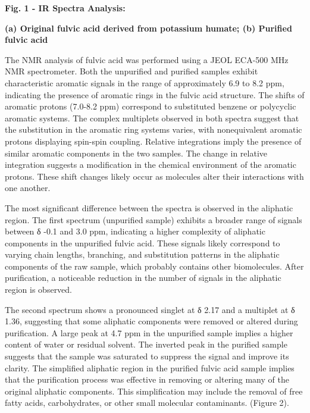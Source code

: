 {\bfseries Fig. 1 - IR Spectra Analysis:}

{\bfseries (a) Original fulvic acid derived from potassium humate; (b)
Purified fulvic acid}

\begin{multicols}{2}
The NMR analysis of fulvic acid was performed using a JEOL ECA-500 MHz
NMR spectrometer. Both the unpurified and purified samples exhibit
characteristic aromatic signals in the range of approximately 6.9 to 8.2
ppm, indicating the presence of aromatic rings in the fulvic acid
structure. The shifts of aromatic protons (7.0-8.2 ppm) correspond to
substituted benzene or polycyclic aromatic systems. The complex
multiplets observed in both spectra suggest that the substitution in the
aromatic ring systems varies, with nonequivalent aromatic protons
displaying spin-spin coupling. Relative integrations imply the presence
of similar aromatic components in the two samples. The change in
relative integration suggests a modification in the chemical environment
of the aromatic protons. These shift changes likely occur as molecules
alter their interactions with one another.

The most significant difference between the spectra is observed in the
aliphatic region. The first spectrum (unpurified sample) exhibits a
broader range of signals between δ -0.1 and 3.0 ppm, indicating a higher
complexity of aliphatic components in the unpurified fulvic acid. These
signals likely correspond to varying chain lengths, branching, and
substitution patterns in the aliphatic components of the raw sample,
which probably contains other biomolecules. After purification, a
noticeable reduction in the number of signals in the aliphatic region is
observed.

The second spectrum shows a pronounced singlet at δ 2.17 and a multiplet
at δ 1.36, suggesting that some aliphatic components were removed or
altered during purification. A large peak at 4.7 ppm in the unpurified
sample implies a higher content of water or residual solvent. The
inverted peak in the purified sample suggests that the sample was
saturated to suppress the signal and improve its clarity. The simplified
aliphatic region in the purified fulvic acid sample implies that the
purification process was effective in removing or altering many of the
original aliphatic components. This simplification may include the
removal of free fatty acids, carbohydrates, or other small molecular
contaminants. (Figure 2).
\end{multicols}


